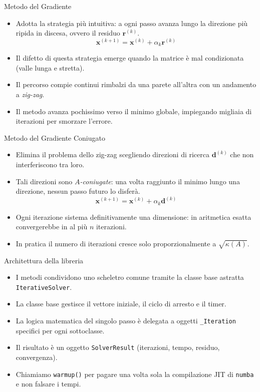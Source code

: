 \documentclass[11pt,aspectratio=169,xcolor=dvipsnames]{beamer}
\begin{document}
\begin{frame}{Metodo del Gradiente}
    \begin{itemize}
        \item Adotta la strategia più intuitiva: a ogni passo avanza lungo la direzione più ripida in discesa, ovvero il residuo $\mathbf{r}^{(k)}$.
        \[ \mathbf{x}^{(k+1)} = \mathbf{x}^{(k)} + \alpha_k \mathbf{r}^{(k)} \]
        \item Il difetto di questa strategia emerge quando la matrice è mal condizionata (valle lunga e stretta).
        \item Il percorso compie continui rimbalzi da una parete all'altra con un andamento a \emph{zig-zag}.
        \item Il metodo avanza pochissimo verso il minimo globale, impiegando migliaia di iterazioni per smorzare l'errore.
    \end{itemize}
\end{frame}

\begin{frame}{Metodo del Gradiente Coniugato}
    \begin{itemize}
        \item Elimina il problema dello zig-zag scegliendo direzioni di ricerca $\mathbf{d}^{(k)}$ che non interferiscono tra loro.
        \item Tali direzioni sono \emph{$A$-coniugate}: una volta raggiunto il minimo lungo una direzione, nessun passo futuro lo disferà.
        \[ \mathbf{x}^{(k+1)} = \mathbf{x}^{(k)} + \alpha_k \mathbf{d}^{(k)} \]
        \item Ogni iterazione sistema definitivamente una dimensione: in aritmetica esatta convergerebbe in al più $n$ iterazioni.
        \item In pratica il numero di iterazioni cresce solo proporzionalmente a $\sqrt{\kappa(A)}$.
    \end{itemize}
\end{frame}

\begin{frame}{Architettura della libreria}
    \begin{itemize}
        \item I metodi condividono uno scheletro comune tramite la classe base astratta \texttt{IterativeSolver}.
        \item La classe base gestisce il vettore iniziale, il ciclo di arresto e il timer.
        \item La logica matematica del singolo passo è delegata a oggetti \texttt{\_Iteration} specifici per ogni sottoclasse.
        \item Il risultato è un oggetto \texttt{SolverResult} (iterazioni, tempo, residuo, convergenza).
        \item Chiamiamo \texttt{warmup()} per pagare una volta sola la compilazione JIT di \texttt{numba} e non falsare i tempi.
    \end{itemize}
\end{frame}
\end{document}
